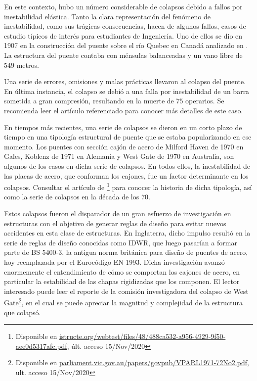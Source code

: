 En este contexto, hubo un número considerable de colapsos debido a fallos por inestabilidad elástica. %
%
Tanto la clara representación del fenómeno de inestabilidad, como sus trágicas consecuencias, hacen de algunos fallos, casos de estudio típicos de interés para estudiantes de Ingeniería. %
%
Uno de ellos se dio en 1907 en la construcción del puente sobre el río Quebec en Canadá analizado en \citep{Brady}. %
%
La estructura del puente contaba con ménsulas balanceadas y un vano libre de $549$ metros. %

Una serie de errores, omisiones y malas prácticas llevaron al colapso del puente. En última instancia, el colapso se debió a una falla por inestabilidad de un barra sometida a gran compresión, resultando en la muerte de $75$ operarios. Se recomienda leer el artículo referenciado para conocer más detalles de este caso.

En tiempos más recientes, una serie de colapsos se dieron en un corto plazo de tiempo en una tipología estructural de puente que se estaba popularizando en ese momento. %
%
Los puentes con sección cajón de acero de Milford Haven de 1970 en Gales, Koblenz de 1971 en Alemania y West Gate de 1970 en Australia, son algunos de los casos en dicha serie de colapsos. %
%
En todos ellos, la inestabilidad de las placas de acero, que conforman los cajones, fue un factor determinante en los colapsos. %
%
Consultar el artículo de \cite{Firth}\footnote{Disponible en \href{https://www.istructe.org/webtest/files/48/488ca532-a956-4929-9f50-aee0d5317afc.pdf}{istructe.org/webtest/files/48/488ca532-a956-4929-9f50-aee0d5317afc.pdf}, últ. acceso 15/Nov/2020} para conocer la historia de dicha tipología, así como la serie de colapsos en la década de los 70.

Estos colapsos fueron el disparador de un gran esfuerzo de investigación en estructuras con el objetivo de generar reglas de diseño para evitar nuevos accidentes en esta clase de estructuras. %
%
En Inglaterra, dicho impulso resultó en la serie de reglas de diseño conocidas como IDWR, que luego pasarían a formar parte de BS 5400-3, la antigua norma británica para diseño de puentes de acero, hoy reemplazada por el Eurocódigo EN 1993. %
%
Dicha investigación avanzó enormemente el entendimiento de cómo se comportan los cajones de acero, en particular la estabilidad de las chapas rigidizadas que los componen. El lector interesado puede leer el reporte de la comisión investigadora del colapso de West Gate\footnote{Disponible en \href{http://www.parliament.vic.gov.au/papers/govpub/VPARL1971-72No2.pdf}{parliament.vic.gov.au/papers/govpub/VPARL1971-72No2.pdf}, ult. acceso 15/Nov/2020}, en el cual se puede apreciar la magnitud y complejidad de la estructura que colapsó. 

